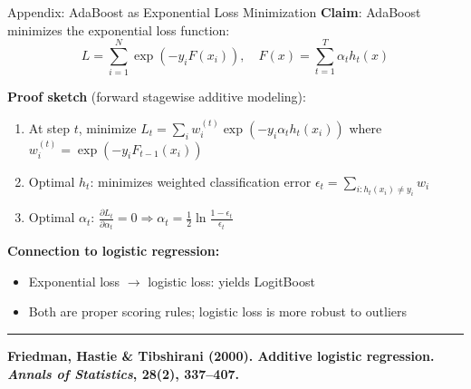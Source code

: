 \documentclass[8pt,aspectratio=169]{beamer}
\newcommand{\bottomnote}[1]{%
\vfill
\vspace{-2mm}
\textcolor{mllavender2}{\rule{\textwidth}{0.4pt}}
\vspace{1mm}
\footnotesize
\textbf{#1}
}
\begin{document}
\begin{frame}[t]{Appendix: AdaBoost as Exponential Loss Minimization}
\textbf{Claim}: AdaBoost minimizes the exponential loss function:
\[
L = \sum_{i=1}^{N} \exp\!\left(-y_i F(x_i)\right), \quad F(x) = \sum_{t=1}^{T} \alpha_t h_t(x)
\]

\textbf{Proof sketch} (forward stagewise additive modeling):
\begin{enumerate}
\item At step $t$, minimize $L_t = \sum_i w_i^{(t)} \exp(-y_i \alpha_t h_t(x_i))$ where $w_i^{(t)} = \exp(-y_i F_{t-1}(x_i))$
\item Optimal $h_t$: minimizes weighted classification error $\epsilon_t = \sum_{i: h_t(x_i) \neq y_i} w_i$
\item Optimal $\alpha_t$: $\frac{\partial L_t}{\partial \alpha_t} = 0 \Rightarrow \alpha_t = \frac{1}{2}\ln\frac{1-\epsilon_t}{\epsilon_t}$
\end{enumerate}

\vspace{0.3em}
\textbf{Connection to logistic regression:}
\begin{itemize}
\item Exponential loss $\to$ logistic loss: yields LogitBoost
\item Both are proper scoring rules; logistic loss is more robust to outliers
\end{itemize}
\bottomnote{Friedman, Hastie \& Tibshirani (2000). Additive logistic regression. \textit{Annals of Statistics}, 28(2), 337--407.}
\end{frame}
\end{document}
